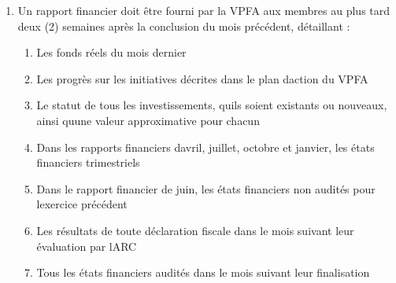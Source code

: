 \begin{enumerate}
 \item
  Un rapport financier doit être fourni par la VPFA aux membres au plus tard deux (2) semaines après la conclusion du mois précédent, détaillant :

  \begin{enumerate}
   \item
    Les fonds réels du mois dernier
   \item
    Les progrès sur les initiatives décrites dans le plan d\textquotesingle action du VPFA
   \item
    Le statut de tous les investissements, qu\textquotesingle ils soient existants ou nouveaux, ainsi qu\textquotesingle une valeur approximative pour chacun
   \item
    Dans les rapports financiers d\textquotesingle avril, juillet, octobre et janvier, les états financiers trimestriels
   \item
    Dans le rapport financier de juin, les états financiers non audités pour l\textquotesingle exercice précédent
   \item
    Les résultats de toute déclaration fiscale dans le mois suivant leur évaluation par l\textquotesingle ARC
   \item
    Tous les états financiers audités dans le mois suivant leur finalisation
  \end{enumerate}
\end{enumerate}
